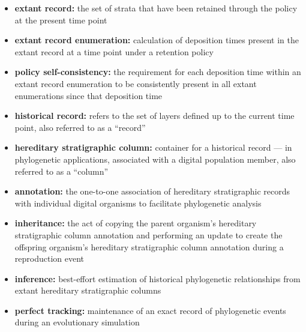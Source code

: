 \begin{itemize}
  \item \textbf{extant record:} the set of strata that have been retained through the policy at the present time point
  \item \textbf{extant record enumeration:} calculation of deposition times present in the extant record at a time point under a retention policy
  \item \textbf{policy self-consistency:} the requirement for each deposition time within an extant record enumeration to be consistently present in all extant enumerations since that deposition time
  \item \textbf{historical record:} refers to the set of layers defined up to the current time point, also referred to as a ``record''
  \item \textbf{hereditary stratigraphic column:} container for a historical record --- in phylogenetic applications, associated with a digital population member, also referred to as a ``column''
  \item \textbf{annotation:} the one-to-one association of hereditary stratigraphic records with individual digital organisms to facilitate phylogenetic analysis
  \item \textbf{inheritance:} the act of copying the parent organism's hereditary stratigraphic column annotation and performing an update to create the offspring organism's hereditary stratigraphic column annotation during a reproduction event
  \item \textbf{inference:} best-effort estimation of historical phylogenetic relationships from extant hereditary stratigraphic columns
  \item \textbf{perfect tracking:} maintenance of an exact record of phylogenetic events during an evolutionary simulation
\end{itemize}
